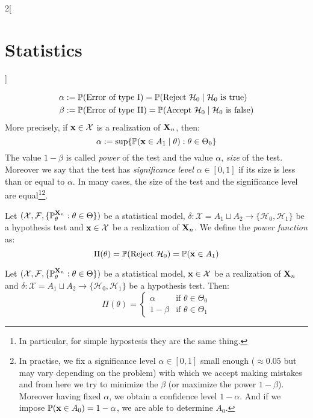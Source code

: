 \documentclass[../../../main.tex]{subfiles}
\begin{document}
\begin{multicols}{2}[\section{Statistics}]
\begin{definition}
    \begin{align*}
      \alpha & :=\mathbb{P}(\text{Error of type I})=\mathbb{P}(\text{Reject $\mathcal{H}_0$}\mid\text{$\mathcal{H}_0$ is true})   \\
      \beta  & :=\mathbb{P}(\text{Error of type II})=\mathbb{P}(\text{Accept $\mathcal{H}_0$}\mid\text{$\mathcal{H}_0$ is false})
    \end{align*}
    More precisely, if $\boldsymbol{\mathrm{x}}\in\mathcal{X}$ is a realization of $\boldsymbol{\mathrm{X}}_n$, then: $$\alpha:=\sup\{\mathbb{P}(\boldsymbol{\mathrm{x}}\in A_1\mid \theta):\theta\in\Theta_0\}$$
    The value $1-\beta$ is called \emph{power} of the test and the value $\alpha$, \emph{size} of the test. Moreover we say that the test has \emph{significance level} $\alpha\in[0,1]$ if its size is less than or equal to $\alpha$. In many cases, the size of the test and the significance level are equal\footnote{In particular, for simple hypostesis they are the same thing.}\footnote{In practise, we fix a significance level $\alpha\in[0,1]$ small enough ($\approx 0.05$ but may vary depending on the problem) with which we accept making mistakes and from here we try to minimize the $\beta$ (or maximize the power $1-\beta$). Moreover having fixed $\alpha$, we obtain a confidence level $1-\alpha$. And if we impose $\mathbb{P}(\boldsymbol{\mathrm{x}}\in A_0)=1-\alpha$, we are able to determine $A_0$.}.
  \end{definition}
  \begin{definition}
    Let $(\mathcal{X},\mathcal{F},\{\mathbb{P}_\theta^{\boldsymbol{\mathrm{X}}_n}:\theta\in\Theta\})$ be a statistical model, $\delta:\mathcal{X}=A_1\sqcup A_2\rightarrow\{\mathcal{H}_0,\mathcal{H}_1\}$ be a hypothesis test and $\boldsymbol{\mathrm{x}}\in\mathcal{X}$ be a realization of $\boldsymbol{\mathrm{X}}_n$. We define the \emph{power function} as: $$\Pi(\theta)=\mathbb{P}(\text{Reject $\mathcal{H}_0$})=\mathbb{P}(\boldsymbol{\mathrm{x}}\in A_1)$$
  \end{definition}
  \begin{proposition}
    Let $(\mathcal{X},\mathcal{F},\{\mathbb{P}_\theta^{\boldsymbol{\mathrm{X}}_n}:\theta\in\Theta\})$ be a statistical model, $\boldsymbol{\mathrm{x}}\in\mathcal{X}$ be a realization of $\boldsymbol{\mathrm{X}}_n$ and $\delta:\mathcal{X}=A_1\sqcup A_2\rightarrow\{\mathcal{H}_0,\mathcal{H}_1\}$ be a hypothesis test. Then:
    $$
      \Pi(\theta)=
      \begin{cases}
        \alpha  & \text{if }\theta\in\Theta_0 \\
        1-\beta & \text{if }\theta\in\Theta_1
      \end{cases}
    $$
  \end{proposition}
  \begin{definition}

\end{definition}
\end{multicols}
\end{document}
